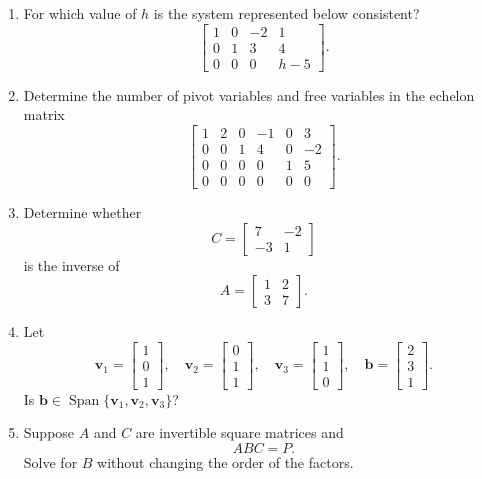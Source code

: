 \documentclass[11pt]{article}
\newif\ifshowsolutions
\newcommand{\vect}[1]{\mathbf{#1}}
\newcommand{\Span}{\operatorname{Span}}
\newcommand{\answerline}{\ifshowsolutions\else\par\vspace{0.55in}\hrulefill\par\fi}
\newcommand{\solution}[1]{%
  \ifshowsolutions
    \par\medskip
    {\color{solutionblue}\textbf{Solution.} #1}
    \par\medskip
  \fi}
\begin{document}
\begin{enumerate}
\item For which value of $h$ is the system represented below consistent?
\[
\left[\begin{array}{ccc|c}
1&0&-2&1\\
0&1&3&4\\
0&0&0&h-5
\end{array}\right].
\]
\answerline
\solution{The system is consistent exactly when $h-5=0$, so $\boxed{h=5}$.}

\item Determine the number of pivot variables and free variables in the echelon matrix
\[
\begin{bmatrix}
1&2&0&-1&0&3\\
0&0&1&4&0&-2\\
0&0&0&0&1&5\\
0&0&0&0&0&0
\end{bmatrix}.
\]
\answerline
\solution{Pivot columns are $1,3,5$. There are $\boxed{3}$ pivot variables and $\boxed{3}$ free variables, in columns $2,4,6$.}

\item Determine whether
\[
C=\begin{bmatrix}7&-2\\-3&1\end{bmatrix}
\]
is the inverse of
\[
A=\begin{bmatrix}1&2\\3&7\end{bmatrix}.
\]
\answerline
\solution{Yes. Direct multiplication gives $AC=CA=I_2$.}

\item Let
\[
\vect v_1=\begin{bmatrix}1\\0\\1\end{bmatrix},\quad
\vect v_2=\begin{bmatrix}0\\1\\1\end{bmatrix},\quad
\vect v_3=\begin{bmatrix}1\\1\\0\end{bmatrix},\quad
\vect b=\begin{bmatrix}2\\3\\1\end{bmatrix}.
\]
Is $\vect b\in\Span\{\vect v_1,\vect v_2,\vect v_3\}$?
\answerline
\solution{Yes. $\vect b=0\vect v_1+\vect v_2+2\vect v_3$.}

\item Suppose $A$ and $C$ are invertible square matrices and
\[
ABC=P.
\]
Solve for $B$ without changing the order of the factors.
\answerline
\solution{Multiply by $A^{-1}$ on the left and $C^{-1}$ on the right: $\boxed{B=A^{-1}PC^{-1}}$.}
\end{enumerate}
\end{document}
